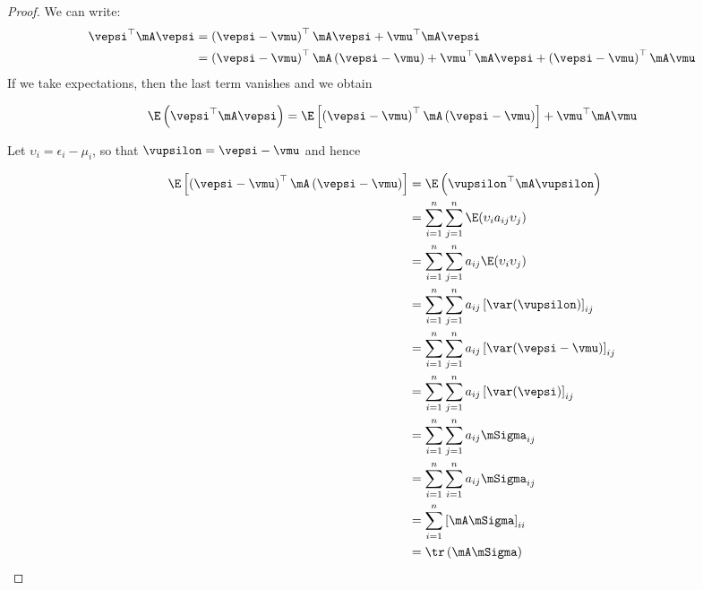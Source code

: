 \documentclass[english,12pt]{book}\usepackage[]{graphicx}\usepackage[]{xcolor}
\begin{document}

\begin{proof}
We can write:
\begin{equation*}
\begin{aligned}
\vepsi^\top\mA\vepsi & = \left(\vepsi - \vmu\right)^\top\mA\vepsi + \vmu^\top\mA\vepsi \\
& = \left(\vepsi - \vmu\right)^\top\mA\left(\vepsi - \vmu\right) + \vmu^\top\mA\vepsi + \left(\vepsi - \vmu\right)^\top\mA\vmu
\end{aligned}
\end{equation*}
If we take expectations, then the last term vanishes and we obtain

\begin{equation}
\E\left(\vepsi^\top\mA\vepsi\right) = \E\left[\left(\vepsi - \vmu\right)^\top\mA\left(\vepsi - \vmu\right)\right] + \vmu^\top\mA\vmu
\end{equation}

Let $\upsilon_i = \epsilon_i - \mu_i$, so that $\vupsilon = \vepsi - \vmu$ and hence

\begin{equation*}
\begin{aligned}
\E\left[\left(\vepsi - \vmu\right)^\top\mA\left(\vepsi - \vmu\right)\right] & = \E\left(\vupsilon^\top\mA\vupsilon\right) \\
& = \sum_{i = 1}^n\sum_{j = 1}^n\E(\upsilon_i a_{ij}\upsilon_j) \\
& = \sum_{i = 1}^n\sum_{j = 1}^na_{ij}\E(\upsilon_i\upsilon_j) \\
& = \sum_{i = 1}^n\sum_{j = 1}^na_{ij}\left[\var(\vupsilon)\right]_{ij} \\
& = \sum_{i = 1}^n\sum_{j = 1}^na_{ij}\left[\var(\vepsi - \vmu)\right]_{ij} \\
& = \sum_{i = 1}^n\sum_{j = 1}^na_{ij}\left[\var(\vepsi)\right]_{ij} \\
& = \sum_{i = 1}^n\sum_{j = 1}^na_{ij}\mSigma_{ij} \\
& = \sum_{i = 1}^n\sum_{i = 1}^na_{ij}\mSigma_{ij} \\
& = \sum_{i = 1}^n \left[\mA\mSigma\right]_{ii} \\
& = \tr\left(\mA\mSigma\right)
\end{aligned}
\end{equation*}
\end{proof}
\end{document}
